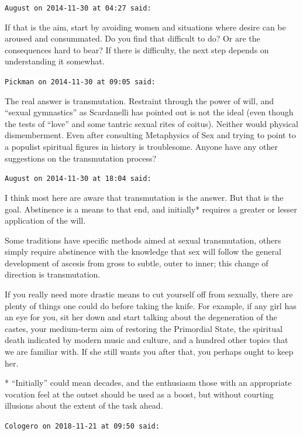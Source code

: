 \begin{footnotesize}
\begin{sffamily}
\hfill

\texttt{August on 2014-11-30 at 04:27 said:}

If that is the aim, start by avoiding women and situations where desire can be aroused and consummated. Do you find that difficult to do? Or are the consequences hard to bear? If there is difficulty, the next step depends on understanding it somewhat.

\hfill

\texttt{Pickman on 2014-11-30 at 09:05 said:}

The real answer is transmutation. Restraint through the power of will, and ``sexual gymnastics'' as Scardanelli has pointed out is not the ideal (even though the tests of ``love'' and some tantric sexual rites of coitus). Neither would physical dismemberment. Even after consulting Metaphysics of Sex and trying to point to a populist spiritual figures in history is troublesome. Anyone have any other suggestions on the transmutation process?

\hfill

\texttt{August on 2014-11-30 at 18:04 said:}

I think most here are aware that transmutation is the answer. But that is the goal. Abstinence is a means to that end, and initially* requires a greater or lesser application of the will.

Some traditions have specific methods aimed at sexual transmutation, others simply require abstinence with the knowledge that sex will follow the general development of ascesis from gross to subtle, outer to inner; this change of direction is transmutation.

If you really need more drastic means to cut yourself off from sexually, there are plenty of things one could do before taking the knife. For example, if any girl has an eye for you, sit her down and start talking about the degeneration of the castes, your medium-term aim of restoring the Primordial State, the spiritual death indicated by modern music and culture, and a hundred other topics that we are familiar with. If she still wants you after that, you perhaps ought to keep her.

* ``Initially'' could mean decades, and the enthusiasm those with an appropriate vocation feel at the outset should be used as a boost, but without courting illusions about the extent of the task ahead.

\hfill

\texttt{Cologero on 2018-11-21 at 09:50 said:}


\end{sffamily}
\end{footnotesize}
